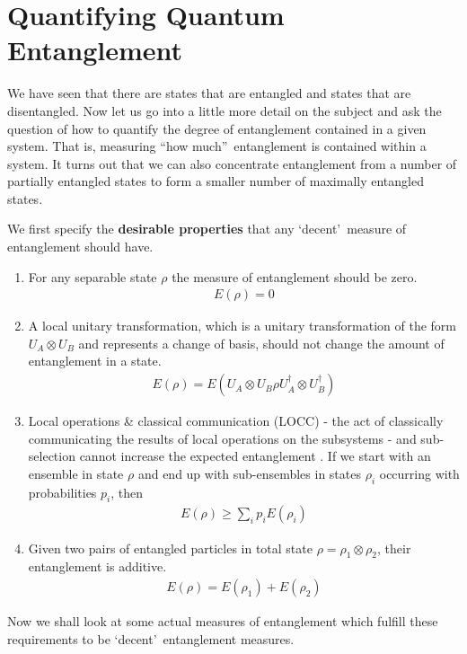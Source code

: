 \section{Quantifying Quantum Entanglement}
\par We have seen that there are states that are entangled and states that are disentangled. Now let us go into a little more detail on the subject and ask the question of how to quantify the degree of entanglement contained in a given system. That is, measuring \textquotedblleft how much\textquotedblright\  entanglement is contained within a system. It turns out that we can also concentrate entanglement from a number of partially entangled states to form a smaller number of maximally entangled states.
\par We first specify the \textbf{desirable properties} that any \textquoteleft decent\textquoteright\ measure of entanglement should have. \cite{vedralteleportation}
\begin{enumerate}
  \item For any separable state $\rho$ the measure of entanglement should be zero.
        \begin{align*} E(\rho) = 0 \end{align*}
  \item A local unitary transformation, which is a unitary transformation of the form $U_A \otimes U_B$ and represents a change of basis, should not change the amount of entanglement in a state.
        \begin{align*} E(\rho) = E(U_A \otimes U_B \rho U_A^{\dagger} \otimes U_B^{\dagger}) \end{align*}
  \item Local operations \& classical communication (LOCC) - the act of classically communicating the results of local operations on the subsystems - and sub-selection cannot increase the expected entanglement \cite{vedralteleportation}. If we start with an ensemble in state $\rho$ and end up with sub-ensembles in states $\rho_i$ occurring with probabilities $p_i$, then
        \begin{align*} E(\rho) \geq \sum_i p_i E(\rho_i) \end{align*}
  \item Given two pairs of entangled particles in total state $\rho = \rho_1 \otimes \rho_2$, their entanglement is additive.
        \begin{align*} E(\rho) = E(\rho_1) + E(\rho_2) \end{align*}
\end{enumerate}
\par Now we shall look at some actual measures of entanglement which fulfill these requirements to be \textquoteleft decent\textquoteright\  entanglement measures. \cite{plenioentanglementmeasures}

